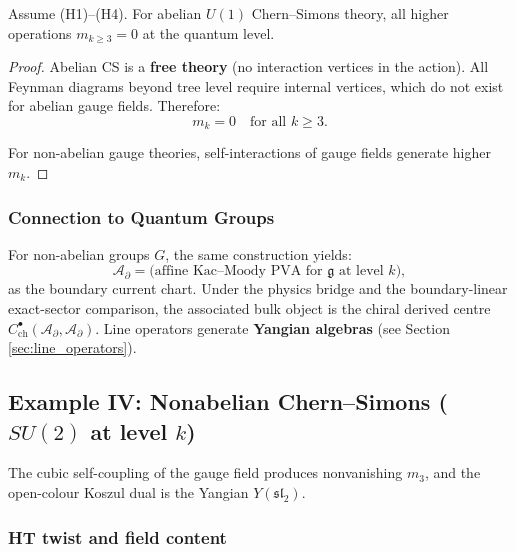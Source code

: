 \begin{proposition}
Assume \textrm{(H1)--(H4)}.
For abelian $U(1)$ Chern--Simons theory, all higher operations $m_{k \geq 3} = 0$ at the quantum level.
\end{proposition}

\begin{proof}
Abelian CS is a \textbf{free theory} (no interaction vertices in the action). All Feynman diagrams beyond tree level require internal vertices, which do not exist for abelian gauge fields. Therefore:
\begin{equation}
m_k = 0 \quad \text{for all } k \geq 3.
\end{equation}

For non-abelian gauge theories, self-interactions of gauge fields generate higher $m_k$.
\end{proof}

\subsubsection{Connection to Quantum Groups}

For non-abelian groups $G$, the same construction yields:
\begin{equation}
\mathcal{A}_{\partial} = \text{(affine Kac--Moody PVA for $\mathfrak{g}$ at level $k$)},
\end{equation}
as the boundary current chart.  Under the physics bridge and the
boundary-linear exact-sector comparison, the associated bulk object is
the chiral derived centre
$C^\bullet_{\mathrm{ch}}(\mathcal{A}_{\partial},\mathcal{A}_{\partial})$.
Line operators generate \textbf{Yangian algebras}
(see Section \ref{sec:line_operators}).

\subsection{Example IV: Nonabelian Chern--Simons ($SU(2)$ at level $k$)}

The cubic self-coupling of the gauge field produces nonvanishing
$m_3$, and the open-colour Koszul dual is the Yangian
$Y(\mathfrak{sl}_2)$.

\subsubsection{HT twist and field content}

